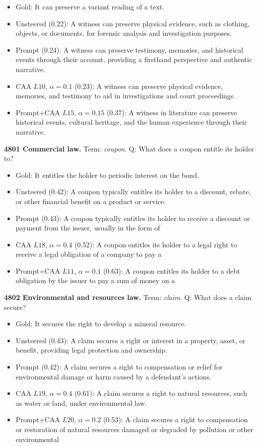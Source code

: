 \begin{itemize}\setlength{\itemsep}{0.15em}\setlength{\parsep}{0pt}\setlength{\topsep}{0.2em}
\item Gold: It can preserve a variant reading of a text.
\item Unsteered (0.22): A witness can preserve physical evidence, such as clothing, objects, or documents, for forensic analysis and investigation purposes.
\item Prompt (0.24): A witness can preserve testimony, memories, and historical events through their account, providing a firsthand perspective and authentic narrative.
\item CAA $L10$, $\alpha=0.1$ (0.23): A witness can preserve physical evidence, memories, and testimony to aid in investigations and court proceedings.
\item Prompt+CAA $L15$, $\alpha=0.15$ (0.37): A witness in literature can preserve historical events, cultural heritage, and the human experience through their narrative.
\end{itemize}
\medskip\noindent\textbf{4801 Commercial law.} Term: \emph{coupon}.
Q: What does a coupon entitle its holder to?
\begin{itemize}\setlength{\itemsep}{0.15em}\setlength{\parsep}{0pt}\setlength{\topsep}{0.2em}
\item Gold: It entitles the holder to periodic interest on the bond.
\item Unsteered (0.42): A coupon typically entitles its holder to a discount, rebate, or other financial benefit on a product or service.
\item Prompt (0.43): A coupon typically entitles its holder to receive a discount or payment from the issuer, usually in the form of
\item CAA $L18$, $\alpha=0.4$ (0.52): A coupon entitles its holder to a legal right to receive a legal obligation of a company to pay a
\item Prompt+CAA $L11$, $\alpha=0.1$ (0.63): A coupon entitles its holder to a debt obligation by the issuer to pay a sum of money on a
\end{itemize}
\medskip\noindent\textbf{4802 Environmental and resources law.} Term: \emph{claim}.
Q: What does a claim secure?
\begin{itemize}\setlength{\itemsep}{0.15em}\setlength{\parsep}{0pt}\setlength{\topsep}{0.2em}
\item Gold: It secures the right to develop a mineral resource.
\item Unsteered (0.43): A claim secures a right or interest in a property, asset, or benefit, providing legal protection and ownership.
\item Prompt (0.42): A claim secures a right to compensation or relief for environmental damage or harm caused by a defendant's actions.
\item CAA $L19$, $\alpha=0.4$ (0.61): A claim secures a right to natural resources, such as water or land, under environmental law.
\item Prompt+CAA $L20$, $\alpha=0.2$ (0.53): A claim secures a right to compensation or restoration of natural resources damaged or degraded by pollution or other environmental
\end{itemize}
